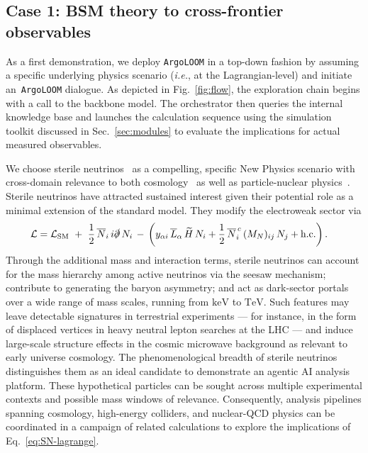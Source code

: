 \documentclass[final,3p,times,sort,compress]{elsarticle}
\newcommand{\AL}{\texttt{ArgoLOOM}\xspace}
\begin{document}

\subsection{Case 1: BSM theory to cross-frontier observables}
\label{sec:top-down}
%
%
As a first demonstration, we deploy \texttt{ArgoLOOM} in a top-down fashion by assuming a specific underlying physics scenario ({\it i.e.}, at the Lagrangian-level) and initiate an~\AL dialogue.
%
As depicted in Fig.~\ref{fig:flow}, the exploration chain begins with a call to the backbone model. 
%
The orchestrator then queries the internal knowledge base and launches the calculation sequence using the simulation toolkit discussed in Sec.~\ref{sec:modules} to evaluate the implications for actual measured observables.
%

%
We choose sterile neutrinos~\cite{Boyarsky:2018tvu} as a compelling, specific New Physics scenario with cross-domain
relevance to both cosmology~\cite{Boyarsky:2009ix} as well as particle-nuclear physics~\cite{Deppisch:2015qwa}.
%
Sterile neutrinos have attracted sustained interest given their potential role as a minimal extension of the standard
model. They modify the electroweak sector via
%
\begin{align}
\mathcal{L} &= \mathcal{L}_{\rm SM}\
  +\ \frac{1}{2}\,\overline{N}_i\,i\slashed{\partial}\,N_i\,
  -\, \bigg(y_{\alpha i}\,\overline{L}_\alpha\,\widetilde H\,N_i
      + \frac{1}{2}\,\overline{N}_i^{\,c}\,(M_N)_{ij}\,N_j + \text{h.c.}
    \bigg)\, .
\label{eq:SN-lagrange}
\end{align}
%
Through the additional mass and interaction terms, sterile neutrinos can account for the mass hierarchy among active neutrinos via the seesaw mechanism;
contribute to generating the baryon asymmetry; and act as dark-sector portals over a wide
range of mass scales, running from $\mathrm{keV}$ to $\mathrm{TeV}$. Such features may
leave detectable signatures in terrestrial experiments --- for instance, in the form of displaced vertices in
heavy neutral lepton searches at the LHC --- and induce large-scale structure effects in
the cosmic microwave background as relevant to early universe cosmology.
%
The phenomenological breadth of sterile neutrinos distinguishes them as an ideal candidate to demonstrate an agentic AI
analysis platform. These hypothetical particles can be sought across multiple experimental contexts and possible mass windows of relevance. Consequently, analysis pipelines spanning cosmology, high-energy colliders, and nuclear-QCD physics can be coordinated in a campaign of related calculations to explore the implications of Eq.~\ref{eq:SN-lagrange}.
%
\end{document}
